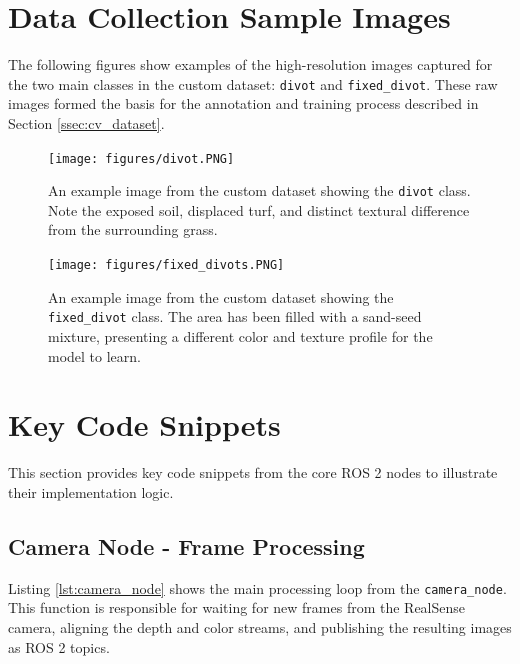 \cleardoublepage %

\section{Data Collection Sample Images}
\label{sec:appendix_dataset_samples}
The following figures show examples of the high-resolution images captured for the two main classes in the custom dataset: \texttt{divot} and \texttt{fixed\_divot}. These raw images formed the basis for the annotation and training process described in Section \ref{ssec:cv_dataset}.

\begin{figure}[h!]
    \centering
    \texttt{[image: figures/divot.PNG]}
    \caption{An example image from the custom dataset showing the \texttt{divot} class. Note the exposed soil, displaced turf, and distinct textural difference from the surrounding grass.}
    \label{fig:appendix_divot_sample}
\end{figure}

\begin{figure}[h!]
    \centering
    \texttt{[image: figures/fixed\_divots.PNG]}
    \caption{An example image from the custom dataset showing the \texttt{fixed\_divot} class. The area has been filled with a sand-seed mixture, presenting a different color and texture profile for the model to learn.}
    \label{fig:appendix_fixed_divot_sample}
\end{figure}

\cleardoublepage %

\section{Key Code Snippets}
\label{sec:appendix_code}
This section provides key code snippets from the core ROS 2 nodes to illustrate their implementation logic.

\subsection{Camera Node - Frame Processing}
Listing \ref{lst:camera_node} shows the main processing loop from the \texttt{camera\_node}. This function is responsible for waiting for new frames from the RealSense camera, aligning the depth and color streams, and publishing the resulting images as ROS 2 topics.

